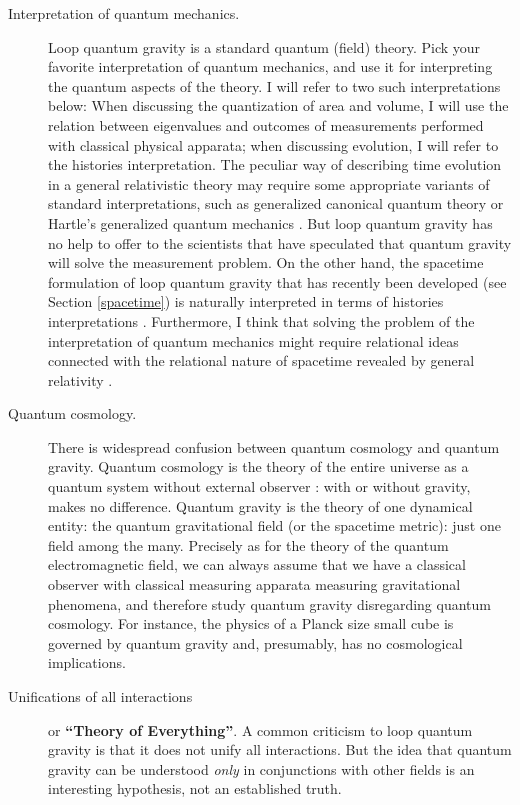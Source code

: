 \begin{description}
	\item[Interpretation of quantum mechanics.]  
	Loop quantum gravity is a standard quantum (field) theory.  
	Pick your favorite interpretation of quantum mechanics, and 
	use it for interpreting the quantum aspects of the theory.  I 
	will refer to two such interpretations below: When discussing 
	the quantization of area and volume, I will use the relation 
	between eigenvalues and outcomes of measurements performed 
	with classical physical apparata; when discussing evolution, I 
	will refer to the histories interpretation.  The peculiar way 
	of describing time evolution in a general relativistic theory 
	may require some appropriate variants of standard 
	interpretations, such as generalized canonical quantum theory 
	\cite{RovelliQM,RovelliTime,RovelliQM3} or Hartle's generalized 
	quantum mechanics \cite{Hartle}.  But loop quantum gravity has 
	no help to offer to the scientists that have speculated that 
	quantum gravity will solve the measurement problem.  On the 
	other hand, the spacetime formulation of loop quantum gravity 
	that has recently been developed (see Section \ref{spacetime}) 
	is naturally interpreted in terms of histories interpretations 
	\cite{Hartle,Isham,Isham2,Isham3,Isham4}.  Furthermore, I 
	think that solving the problem of the interpretation of 
	quantum mechanics might require relational ideas connected 
	with the relational nature of spacetime revealed by general 
	relativity \cite{RovelliQMint,RovelliHalf}.

	\item[Quantum cosmology.]  There is widespread confusion 
	between quantum cosmology and quantum gravity.  Quantum 
	cosmology is the theory of the entire universe as a quantum 
	system without external observer \cite{HartleQC}: with or 
	without gravity, makes no difference.  Quantum gravity is the 
	theory of one dynamical entity: the quantum gravitational 
	field (or the spacetime metric): just one field among the 
	many.  Precisely as for the theory of the quantum 
	electromagnetic field, we can always assume that we have a 
	classical observer with classical measuring apparata 
	measuring gravitational phenomena, and therefore study 
	quantum gravity disregarding quantum cosmology.  For 
	instance, the physics of a Planck size small cube is governed 
	by quantum gravity and, presumably, has no cosmological 
	implications.

	\item[Unifications of all interactions] or {\bf ``Theory of 
	Everything''}.  A common criticism to loop quantum gravity is 
	that it does not unify all interactions.  But the idea that 
	quantum gravity can be understood {\em only\/} in 
	conjunctions with other fields is an interesting hypothesis, 
	not an established truth.


\end{description}
